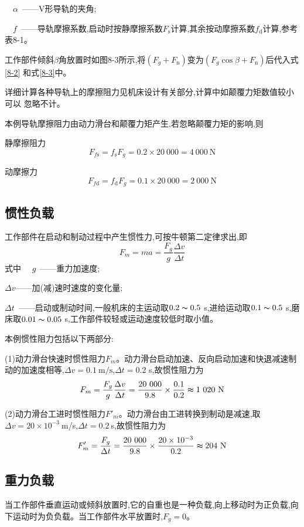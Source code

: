 \ \ $\alpha$\ ——V形导轨的夹角;

\ \ $f$\ ——导轨摩擦系数,启动时按静摩擦系数$F_{\text{s}}$计算,其余按动摩擦系数$f_{\text{d}}$计算,参考表8-1。

工作部件倾斜$\beta$角放置时如图8-3所示,将$(F_g+F_{\text{n}})$变为$(F_g\cos{\beta}+F_{\text{n}})$后代入式\ref{8-2}
和式\ref{8-3}中。

详细计算各种导轨上的摩擦阻力见机床设计有关部分,计算中如颠覆力矩数值较小可以
忽略不计。

本例导轨摩擦阻力由动力滑台和颠覆力矩产生,若忽略颠覆力矩的影响,则

静摩擦阻力
$$F_{f\text{s}}=f_{\text{s}}F_g=0.2\times 20\ 000=4\ 000\ \text{N}$$

动摩擦力
$$F_{f\text{d}}=f_{\text{d}}F_g=0.1\times 20\ 000=2\ 000\ \text{N}$$

\subsection{惯性负载}
工作部件在启动和制动过程中产生惯性力,可按牛顿第二定律求出,即
\begin{equation}
    F_m=ma=\frac{F_g}{g}\frac{\Delta v}{\Delta t}
\end{equation}
式中
\ \ $g$\ ——重力加速度;

$\Delta v$——加(减)速时速度的变化量;

$\Delta t$\ ——启动或制动时间,一般机床的主运动取$0.2\thicksim 0.5$ s,进给运动取$0.1\thicksim 0.5$ s,磨床取$0.01\thicksim 0.05$ s,工作部件较轻或运动速度较低时取小值。

本例惯性阻力包括以下两部分:

(1)动力滑台快速时惯性阻力$F_m$。动力滑台启动加速、反向启动加速和快退减速制动的加速度相等,$\Delta v=0.1\ \text{m/s}$,$\Delta t=0.2$ s,故惯性阻力为
$$F_m=\frac{F_g}{g}\frac{\Delta v}{\Delta t}=\frac{20\ 000}{9.8}\times\frac{0.1}{0.2}\thickapprox 1\ 020\ \text{N}$$

(2)动力滑台工进时惯性阻力$F'_m$。动力滑台由工进转换到制动是减速,取$\Delta v=20\times 10^{-3}\ $m/s,$\Delta t=0.2\ $s,故惯性阻力为$$F'_m=\frac{F_g}{\Delta t}=\frac{20\ 000}{9.8}\times \frac{20\times 10^{-3}}{0.2}\thickapprox 204\ \text{N}$$

\subsection{重力负载}
当工作部件垂直运动或倾斜放置时,它的自重也是一种负载,向上移动时为正负载,向下运动时为负负载。当工作部件水平放置时,$F_g=0$。

